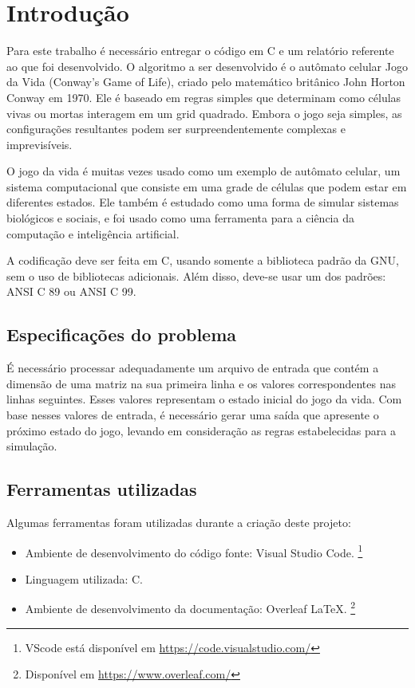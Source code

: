 \documentclass{article}
\begin{document}


\section{Introdução}
\DESCRICAO{}
Para este trabalho é necessário entregar o código em C e um relatório referente ao que foi desenvolvido. O algoritmo a ser desenvolvido é o autômato celular Jogo da Vida (Conway's Game of Life), criado pelo matemático britânico John Horton Conway em 1970.  Ele é baseado em regras simples que determinam como células vivas ou mortas interagem em um grid quadrado. Embora o jogo seja simples, as configurações resultantes podem ser surpreendentemente complexas e imprevisíveis.

O jogo da vida é muitas vezes usado como um exemplo de autômato celular, um sistema computacional que consiste em uma grade de células que podem estar em diferentes estados. Ele também é estudado como uma forma de simular sistemas biológicos e sociais, e foi usado como uma ferramenta para a ciência da computação e inteligência artificial.

A codificação deve ser feita em C, usando somente a biblioteca padrão da GNU, sem o uso de bibliotecas adicionais. Além disso, deve-se usar um dos padrões: ANSI C 89 ou ANSI C 99.

\subsection{Especificações do problema}

\DESCRICAO{}
É necessário processar adequadamente um arquivo de entrada que contém a dimensão de uma matriz na sua primeira linha e os valores correspondentes nas linhas seguintes. Esses valores representam o estado inicial do jogo da vida. Com base nesses valores de entrada, é necessário gerar uma saída que apresente o próximo estado do jogo, levando em consideração as regras estabelecidas para a simulação.

\subsection{Ferramentas utilizadas}
Algumas ferramentas foram utilizadas durante a criação deste projeto:

\begin{itemize}
  \item Ambiente de desenvolvimento do código fonte: Visual Studio Code. \footnote{VScode está disponível em \url{https://code.visualstudio.com/}}
  \item Linguagem utilizada: C.
  \item Ambiente de desenvolvimento da documentação: Overleaf \LaTeX. \footnote{Disponível em \url{https://www.overleaf.com/}}
\end{itemize}
\end{document}
